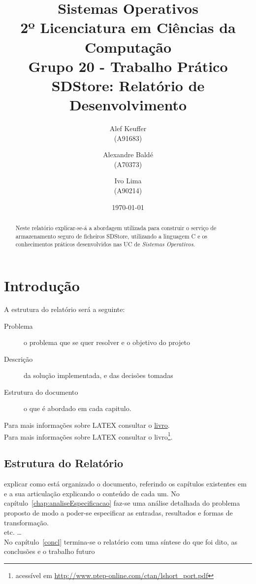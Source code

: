 \documentclass[11pt,a4paper]{report}%
\title{Sistemas Operativos\\
      2º Licenciatura em Ciências da Computação \\
      \textbf{Grupo 20 - Trabalho Prático}\\ SDStore: Relatório de Desenvolvimento
      } %
\author{Alef Keuffer\\ (A91683) \and Alexandre Baldé\\ (A70373)
         \and Ivo Lima\\ (A90214)
       } %
\date{\today} %
\def\so{\emph{Sistemas Operativos}\xspace}
\begin{document}
\maketitle %

\begin{abstract}  %
Neste relatório explicar-se-á a abordagem utilizada para construir o serviço de
armazenamento seguro de ficheiros SDStore, utilizando a linguagem C e os conhecimentos
práticos desenvolvidos nas UC de \so.
\end{abstract}

\tableofcontents %

\chapter{Introdução} \label{chap:intro} %

A estrutura do relatório será a seguinte:

\begin{description}  %
  \item[Problema] o problema que se quer resolver e o objetivo do projeto
  \item[Descrição] da solução implementada, e das decisões tomadas
  \item[] 
  \item[Estrutura do documento] o que é abordado em cada capitulo.
\end{description}


Para mais informações sobre LATEX consultar o
 \href{http://www.ptep-online.com/ctan/lshort_port.pdf}{livro}.\\

 Para mais informações sobre LATEX
 consultar o livro\footnote{acessível em \url{http://www.ptep-online.com/ctan/lshort_port.pdf}}.


\section*{Estrutura do Relatório}
explicar como está organizado o documento, referindo os capítulos existentes em~\cite{deransart:1990}
e a sua articulação explicando o conteúdo de cada um.
No capítulo~\ref{chap:analiseEspecificacao} faz-se uma análise detalhada do problema proposto
de modo a poder-se especificar  as entradas, resultados e formas de transformação.\\
etc. \ldots\\ %
No capítulo~\ref{concl} termina-se o relatório com uma síntese do que foi dito,
as conclusões e o trabalho futuro
\end{document}
